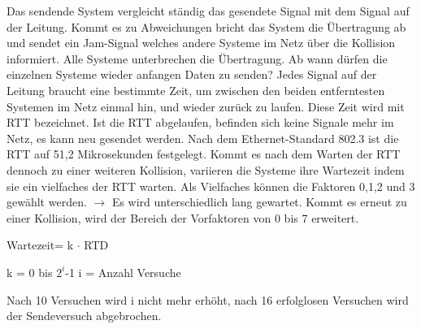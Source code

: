 \documentclass[12pt,a4paper]{article}
\begin{document}
    Das sendende System vergleicht ständig das gesendete Signal mit dem Signal auf der Leitung. Kommt es zu Abweichungen bricht das System die Übertragung ab und sendet ein Jam-Signal welches andere Systeme im Netz über die Kollision informiert. Alle Systeme unterbrechen die Übertragung.\newline
    Ab wann dürfen die einzelnen Systeme wieder anfangen Daten zu senden?\newline\newline
    Jedes Signal auf der Leitung braucht eine bestimmte Zeit, um zwischen den beiden entferntesten Systemen im Netz einmal hin, und wieder zurück zu laufen. Diese Zeit wird mit RTT bezeichnet. Ist die RTT abgelaufen, befinden sich keine Signale mehr im Netz, es kann neu gesendet werden. \newline\newline
    Nach dem Ethernet-Standard 802.3 ist die RTT auf 51,2 Mikrosekunden festgelegt.\newline\newline
    Kommt es nach dem Warten der RTT dennoch zu einer weiteren Kollision, variieren die Systeme ihre Wartezeit indem sie ein vielfaches der RTT warten. Als Vielfaches können die Faktoren 0,1,2 und 3 gewählt werden.\newline
    $\longrightarrow$ Es wird unterschiedlich lang gewartet. \newline\newline
    Kommt es erneut zu einer Kollision, wird der Bereich der Vorfaktoren von 0 bis 7 erweitert.
    \begin{center}
        Wartezeit= k $\cdot$ RTD
    \end{center}
    \begin{center}
        k = 0 bis $2^{i}$-1 \hspace{2cm} i = Anzahl Versuche
    \end{center}
    Nach 10 Versuchen wird i nicht mehr erhöht, nach 16 erfolglosen Versuchen wird der Sendeversuch abgebrochen.
\end{document}
